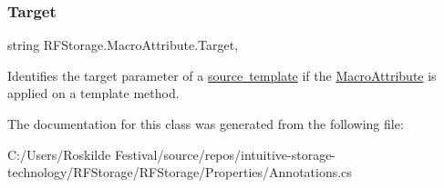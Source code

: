 \subsubsection{\texorpdfstring{Target}{Target}}
{\footnotesize\ttfamily string R\+F\+Storage.\+Macro\+Attribute.\+Target\hspace{0.3cm}{\ttfamily [get]}, {\ttfamily [set]}}



Identifies the target parameter of a \mbox{\hyperlink{class_r_f_storage_1_1_source_template_attribute}{source template}} if the \mbox{\hyperlink{class_r_f_storage_1_1_macro_attribute}{Macro\+Attribute}} is applied on a template method. 



The documentation for this class was generated from the following file\+:\begin{DoxyCompactItemize}
\item 
C\+:/\+Users/\+Roskilde Festival/source/repos/intuitive-\/storage-\/technology/\+R\+F\+Storage/\+R\+F\+Storage/\+Properties/Annotations.\+cs\end{DoxyCompactItemize}
